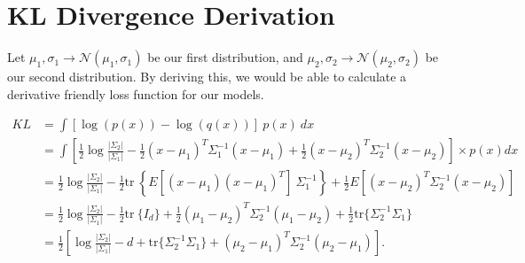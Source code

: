 \documentclass[12pt,twoside]{report}
\begin{document}
\section{KL Divergence Derivation}
\label{kl_derivation}
Let $\mu_1, \sigma_1 \rightarrow \mathcal{N}(\mu_1,\sigma_1)$ be our first distribution, and $\mu_2, \sigma_2 \rightarrow \mathcal{N}(\mu_2,\sigma_2)$ be our second distribution. By deriving this, we would be able to calculate a derivative friendly loss function for our models.

\begin{equation}
	\label{eq:t}
	\begin{aligned}
	KL &= \int \left[\log( p(x)) - \log( q(x)) \right]\ p(x)\ dx \\
	&= \int \left[ \frac{1}{2} \log\frac{|\Sigma_2|}{|\Sigma_1|} - \frac{1}{2} (x-\mu_1)^T\Sigma_1^{-1}(x-\mu_1) + \frac{1}{2} (x-\mu_2)^T\Sigma_2^{-1}(x-\mu_2) \right] \times p(x) dx \\
	&= \frac{1}{2} \log\frac{|\Sigma_2|}{|\Sigma_1|} - \frac{1}{2} \text{tr}\ \left\{E[(x - \mu_1)(x - \mu_1)^T] \ \Sigma_1^{-1} \right\} + \frac{1}{2} E[(x - \mu_2)^T \Sigma_2^{-1} (x - \mu_2)] \\
	&= \frac{1}{2} \log\frac{|\Sigma_2|}{|\Sigma_1|} - \frac{1}{2} \text{tr}\ \{I_d \} + \frac{1}{2} (\mu_1 - \mu_2)^T \Sigma_2^{-1} (\mu_1 - \mu_2) + \frac{1}{2} \text{tr} \{ \Sigma_2^{-1} \Sigma_1 \} \\
	&= \frac{1}{2}\left[\log\frac{|\Sigma_2|}{|\Sigma_1|} - d + \text{tr} \{ \Sigma_2^{-1}\Sigma_1 \} + (\mu_2 - \mu_1)^T \Sigma_2^{-1}(\mu_2 - \mu_1)\right].
\end{aligned}
\end{equation}
\end{document}
